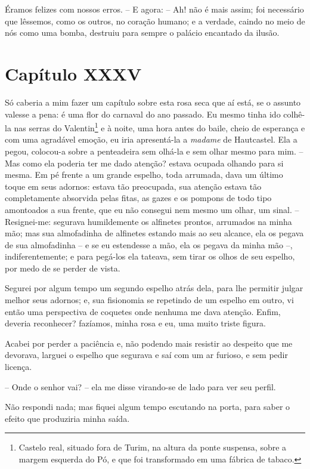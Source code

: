  Éramos felizes com nossos erros. -- E agora: -- Ah! não é mais assim;
foi necessário que lêssemos, como os outros, no coração humano; e a
verdade, caindo no meio de nós como uma bomba, destruiu para sempre o
palácio encantado da ilusão.

\section{Capítulo XXXV}

 Só caberia a mim fazer um capítulo sobre esta rosa seca que aí está, se
o assunto valesse a pena: é uma flor do carnaval do ano passado. Eu
mesmo tinha ido colhê-la nas serras do Valentin\footnote{ Castelo real,
situado fora de Turim, na altura da ponte suspensa, sobre a margem
esquerda do Pó, e que foi transformado em uma fábrica de tabaco.}
e à noite, uma hora antes do baile, cheio de esperança e com uma
agradável emoção, eu iria apresentá-la a \textit{madame} de Hautcastel.
Ela a pegou, colocou-a sobre a penteadeira sem olhá-la e sem olhar
mesmo para mim. -- Mas como ela poderia ter me dado atenção? estava
ocupada olhando para si mesma. Em pé frente a um grande espelho, toda
arrumada, dava um último toque em seus adornos: estava tão preocupada,
sua atenção estava tão completamente absorvida pelas fitas, as gazes e
os pompons de todo tipo amontoados a sua frente, que eu não consegui
nem mesmo um olhar, um sinal. -- Resignei-me: segurava humildemente os
alfinetes prontos, arrumados na minha mão; mas sua almofadinha de
alfinetes estando mais ao seu alcance, ela os pegava de sua
almofadinha -- e se eu estendesse a mão, ela os pegava da minha mão
--, indiferentemente; e para pegá-los ela tateava, sem tirar os olhos
de seu espelho, por medo de se perder de vista.

 Segurei por algum tempo um segundo espelho atrás dela, para lhe
permitir julgar melhor seus adornos; e, sua fisionomia se repetindo de
um espelho em outro, vi então uma perspectiva de coquetes onde nenhuma
me dava atenção. Enfim, deveria reconhecer? fazíamos, minha rosa e eu,
uma muito triste figura.

 Acabei por perder a paciência e, não podendo mais resistir ao despeito
que me devorava, larguei o espelho que segurava e saí com um ar
furioso, e sem pedir licença.

 -- Onde o senhor vai? -- ela me disse virando-se de lado para ver seu
perfil. 

Não respondi nada; mas fiquei algum tempo escutando na porta, para saber
o efeito que produziria minha saída.


